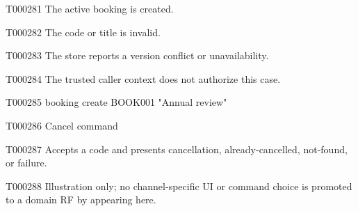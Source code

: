\documentclass[11pt,a4paper]{article}
\begin{document}
\begin{atlasparagraph}{T000281}
The active booking is created.
\end{atlasparagraph}
\begin{atlasparagraph}{T000282}
The code or title is invalid.
\end{atlasparagraph}
\begin{atlasparagraph}{T000283}
The store reports a version conflict or unavailability.
\end{atlasparagraph}
\begin{atlasparagraph}{T000284}
The trusted caller context does not authorize this case.
\end{atlasparagraph}
\begin{atlascode}{T000285}
booking create BOOK001 "Annual review"
\end{atlascode}
\begin{atlastext}{T000286}
Cancel command
\end{atlastext}
\begin{atlasparagraph}{T000287}
Accepts a code and presents cancellation, already-cancelled, not-found, or failure.
\end{atlasparagraph}
\begin{atlasparagraph}{T000288}
Illustration only; no channel-specific UI or command choice is promoted to a domain RF by appearing here.
\end{atlasparagraph}
\end{document}
